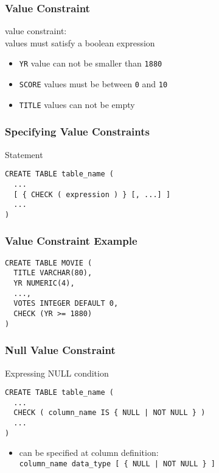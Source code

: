 \documentclass[dvipsnames]{beamer}
\theoremstyle{plain}
\begin{document}
\begin{frame}
  \frametitle{Value Constraint}

  \begin{definition}
    \alert{value constraint}:\\
      values must satisfy a boolean expression
  \end{definition}

  \pause
  \begin{example}
    \begin{itemize}
      \item \texttt{YR} value can not be smaller than \texttt{1880}
      \item \texttt{SCORE} values must be between \texttt{0} and \texttt{10}
      \item \texttt{TITLE} values can not be empty
    \end{itemize}
  \end{example}
\end{frame}

\begin{frame}[fragile]
  \frametitle{Specifying Value Constraints}

  \begin{block}{Statement}
    \begin{lstlisting}
CREATE TABLE table_name (
  ...
  [ { CHECK ( expression ) } [, ...] ]
  ...
)
    \end{lstlisting}
  \end{block}
\end{frame}

\begin{frame}[fragile]
  \frametitle{Value Constraint Example}

  \begin{example}
    \begin{lstlisting}
CREATE TABLE MOVIE (
  TITLE VARCHAR(80),
  YR NUMERIC(4),
  ...,
  VOTES INTEGER DEFAULT 0,
  CHECK (YR >= 1880)
)
    \end{lstlisting}
  \end{example}
\end{frame}

\begin{frame}[fragile]
  \frametitle{Null Value Constraint}

  \begin{block}{Expressing NULL condition}
    \begin{lstlisting}
CREATE TABLE table_name (
  ...
  CHECK ( column_name IS { NULL | NOT NULL } )
  ...
)
    \end{lstlisting}
  \end{block}

  \pause
  \begin{itemize}
    \item can be specified at column definition:\\
      \lstinline!column_name data_type [ { NULL | NOT NULL } ]!
  \end{itemize}
\end{frame}
\end{document}

